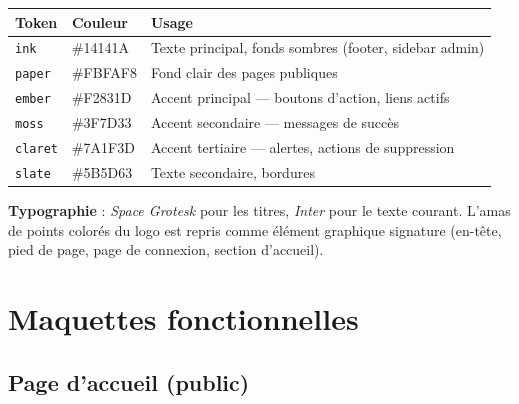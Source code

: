 \documentclass[11pt,a4paper]{report}
\begin{document}
\begin{center}
\renewcommand{\arraystretch}{1.3}
\begin{tabular}{L{2.5cm} L{2.5cm} L{6.6cm}}
\toprule
{}
\textbf{Token} & \textbf{Couleur} & \textbf{Usage} \\
\midrule
\texttt{ink} & \#14141A & Texte principal, fonds sombres (footer, sidebar admin) \\
\texttt{paper} & \#FBFAF8 & Fond clair des pages publiques \\
\texttt{ember} & \#F2831D & Accent principal --- boutons d'action, liens actifs \\
\texttt{moss} & \#3F7D33 & Accent secondaire --- messages de succès \\
\texttt{claret} & \#7A1F3D & Accent tertiaire --- alertes, actions de suppression \\
\texttt{slate} & \#5B5D63 & Texte secondaire, bordures \\
\bottomrule
\end{tabular}
\end{center}

\textbf{Typographie} : \textit{Space Grotesk} pour les titres,
\textit{Inter} pour le texte courant. L'amas de points colorés du logo est
repris comme élément graphique signature (en-tête, pied de page, page de
connexion, section d'accueil).

\section{Maquettes fonctionnelles}

\subsection*{Page d'accueil (public)}
\end{document}

